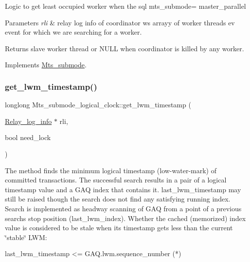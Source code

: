Logic to get least occupied worker when the sql mts\+\_\+submode= master\+\_\+parallel 
\begin{DoxyParams}{Parameters}
{\em rli} & relay log info of coordinator ws arrayy of worker threads ev event for which we are searching for a worker. \\
\hline
\end{DoxyParams}
\begin{DoxyReturn}{Returns}
slave worker thread or N\+U\+LL when coordinator is killed by any worker. 
\end{DoxyReturn}


Implements \mbox{\hyperlink{classMts__submode}{Mts\+\_\+submode}}.

\mbox{\label{classMts__submode__logical__clock_ac91a392c2d94d6e6045f0ca8f1cbfa00}} 
\subsubsection{\texorpdfstring{get\+\_\+lwm\+\_\+timestamp()}{get\_lwm\_timestamp()}}
{\footnotesize\ttfamily longlong Mts\+\_\+submode\+\_\+logical\+\_\+clock\+::get\+\_\+lwm\+\_\+timestamp (\begin{DoxyParamCaption}\item[{\mbox{\hyperlink{classRelay__log__info}{Relay\+\_\+log\+\_\+info}} $\ast$}]{rli,  }\item[{bool}]{need\+\_\+lock }\end{DoxyParamCaption})}

The method finds the minimum logical timestamp (low-\/water-\/mark) of committed transactions. The successful search results in a pair of a logical timestamp value and a G\+AQ index that contains it. last\+\_\+lwm\+\_\+timestamp may still be raised though the search does not find any satisfying running index. Search is implemented as headway scanning of G\+AQ from a point of a previous search\textquotesingle{}s stop position (last\+\_\+lwm\+\_\+index). Whether the cached (memorized) index value is considered to be stale when its timestamp gets less than the current \char`\"{}stable\char`\"{} L\+WM\+: \begin{DoxyVerb} last_lwm_timestamp <= GAQ.lwm.sequence_number           (*)
\end{DoxyVerb}


